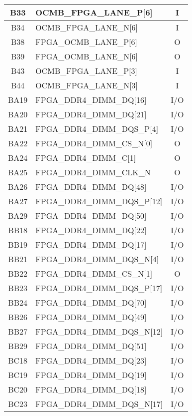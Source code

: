 \begin{longtable}[l]{| c | l | c |}
  B33  & OCMB\_FPGA\_LANE\_P[6]       & I   \\ \hline
  B34  & OCMB\_FPGA\_LANE\_N[6]       & I   \\ \hline
  B38  & FPGA\_OCMB\_LANE\_P[6]       & O   \\ \hline
  B39  & FPGA\_OCMB\_LANE\_N[6]       & O   \\ \hline
  B43  & OCMB\_FPGA\_LANE\_P[3]       & I   \\ \hline
  B44  & OCMB\_FPGA\_LANE\_N[3]       & I   \\ \hline
  BA19 & FPGA\_DDR4\_DIMM\_DQ[16]     & I/O \\ \hline
  BA20 & FPGA\_DDR4\_DIMM\_DQ[21]     & I/O \\ \hline
  BA21 & FPGA\_DDR4\_DIMM\_DQS\_P[4]  & I/O \\ \hline
  BA22 & FPGA\_DDR4\_DIMM\_CS\_N[0]   & O   \\ \hline
  BA24 & FPGA\_DDR4\_DIMM\_C[1]       & O   \\ \hline
  BA25 & FPGA\_DDR4\_DIMM\_CLK\_N     & O   \\ \hline
  BA26 & FPGA\_DDR4\_DIMM\_DQ[48]     & I/O \\ \hline
  BA27 & FPGA\_DDR4\_DIMM\_DQS\_P[12] & I/O \\ \hline
  BA29 & FPGA\_DDR4\_DIMM\_DQ[50]     & I/O \\ \hline
  BB18 & FPGA\_DDR4\_DIMM\_DQ[22]     & I/O \\ \hline
  BB19 & FPGA\_DDR4\_DIMM\_DQ[17]     & I/O \\ \hline
  BB21 & FPGA\_DDR4\_DIMM\_DQS\_N[4]  & I/O \\ \hline
  BB22 & FPGA\_DDR4\_DIMM\_CS\_N[1]   & O   \\ \hline
  BB23 & FPGA\_DDR4\_DIMM\_DQS\_P[17] & I/O \\ \hline
  BB24 & FPGA\_DDR4\_DIMM\_DQ[70]     & I/O \\ \hline
  BB26 & FPGA\_DDR4\_DIMM\_DQ[49]     & I/O \\ \hline
  BB27 & FPGA\_DDR4\_DIMM\_DQS\_N[12] & I/O \\ \hline
  BB29 & FPGA\_DDR4\_DIMM\_DQ[51]     & I/O \\ \hline
  BC18 & FPGA\_DDR4\_DIMM\_DQ[23]     & I/O \\ \hline
  BC19 & FPGA\_DDR4\_DIMM\_DQ[19]     & I/O \\ \hline
  BC20 & FPGA\_DDR4\_DIMM\_DQ[18]     & I/O \\ \hline
  BC23 & FPGA\_DDR4\_DIMM\_DQS\_N[17] & I/O \\ \hline

\end{longtable}

